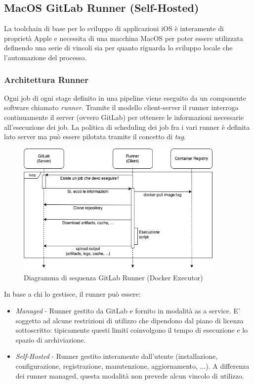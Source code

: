 \subsection{MacOS GitLab Runner (Self-Hosted)}
La toolchain di base per lo sviluppo di applicazioni iOS è interamente di proprietà Apple e necessita di una macchina MacOS per poter essere utilizzata definendo una serie di vincoli sia per quanto riguarda lo sviluppo locale che l'automazione del processo.
\subsubsection{Architettura Runner}
Ogni job di ogni stage definito in una pipeline viene eseguito da un componente software chiamato \textit{runner}. Tramite il modello client-server il runner interroga continuamente il server (ovvero GitLab) per ottenere le informazioni necessarie all'esecuzione dei job. La politica di scheduling dei job fra i vari runner è definita lato server ma può essere pilotata tramite il concetto di \textit{tag}.

\begin{figure}[H]
\centering
\includegraphics[width=0.9\textwidth]{img/tesi-17-runner.drawio.png}
\caption{Diagramma di sequenza GitLab Runner (Docker Executor)}
\end{figure}

In base a chi lo gestisce, il runner può essere:
\begin{itemize}
    \item \textit{Managed} - Runner gestito da GitLab e fornito in modalità as a service. E' soggetto ad alcune restrizioni di utilizzo che dipendono dal piano di licenza sottoscritto: tipicamente questi limiti coinvolgono il tempo di esecuzione e lo spazio di archiviazione.
    \item \textit{Self-Hosted} - Runner gestito interamente dall'utente (installazione, configurazione, registrazione, manutenzione, aggiornamento, ...). A differenza dei runner managed, questa modalità non prevede alcun vincolo di utilizzo.
\end{itemize}

